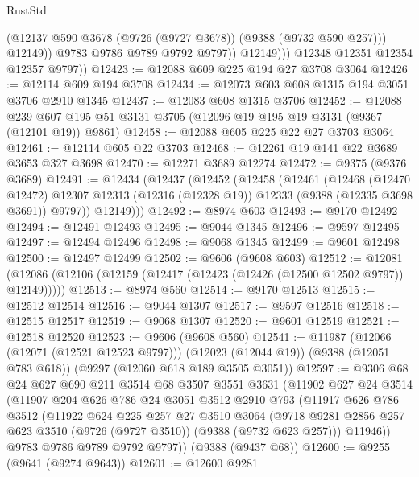 \begin{lexlean}{RustStd}
\begin{coremodule}
                      (@12137 @590 @3678 (@9726 (@9727 @3678)) (@9388 (@9732 @590 @257)))
                      @12149))
                  @9783
                  @9786
                  @9789
                  @9792
                  @9797))
              @12149)))
        @12348
        @12351
        @12354
        @12357
        @9797))
@12423 := @12088 @609 @225 @194 @27 @3708 @3064
@12426 := @12114 @609 @194 @3708
@12434 := @12073 @603 @608 @1315 @194 @3051 @3706 @2910 @1345
@12437 := @12083 @608 @1315 @3706
@12452 := @12088
    @239
    @607
    @195
    @51
    @3131
    @3705
    (@12096 @19 @195 @19 @3131 (@9367 (@12101 @19)) @9861)
@12458 := @12088 @605 @225 @22 @27 @3703 @3064
@12461 := @12114 @605 @22 @3703
@12468 := @12261 @19 @141 @22 @3689 @3653 @327 @3698
@12470 := @12271 @3689 @12274
@12472 := @9375 (@9376 @3689)
@12491 := @12434
    (@12437
      (@12452
        (@12458
          (@12461
            (@12468
              (@12470 @12472)
              @12307
              @12313
              (@12316 (@12328 @19))
              @12333
              (@9388 (@12335 @3698 @3691))
              @9797))
          @12149)))
@12492 := @8974 @603
@12493 := @9170 @12492
@12494 := @12491 @12493
@12495 := @9044 @1345
@12496 := @9597 @12495
@12497 := @12494 @12496
@12498 := @9068 @1345
@12499 := @9601 @12498
@12500 := @12497 @12499
@12502 := @9606 (@9608 @603)
@12512 := @12081 (@12086 (@12106 (@12159 (@12417 (@12423 (@12426 (@12500 @12502 @9797)) @12149)))))
@12513 := @8974 @560
@12514 := @9170 @12513
@12515 := @12512 @12514
@12516 := @9044 @1307
@12517 := @9597 @12516
@12518 := @12515 @12517
@12519 := @9068 @1307
@12520 := @9601 @12519
@12521 := @12518 @12520
@12523 := @9606 (@9608 @560)
@12541 := @11987
    (@12066 (@12071 (@12521 @12523 @9797)))
    (@12023 (@12044 @19))
    (@9388 (@12051 @783 @618))
    (@9297 (@12060 @618 @189 @3505 @3051))
@12597 := @9306
    @68
    @24
    @627
    @690
    @211
    @3514
    @68
    @3507
    @3551
    @3631
    (@11902
      @627
      @24
      @3514
      (@11907
        @204
        @626
        @786
        @24
        @3051
        @3512
        @2910
        @793
        (@11917
          @626
          @786
          @3512
          (@11922
            @624
            @225
            @257
            @27
            @3510
            @3064
            (@9718 @9281 @2856 @257 @623 @3510 (@9726 (@9727 @3510)) (@9388 (@9732 @623 @257)))
            @11946))
        @9783
        @9786
        @9789
        @9792
        @9797))
    (@9388 (@9437 @68))
@12600 := @9255 (@9641 (@9274 @9643))
@12601 := @12600 @9281

\end{coremodule}
\end{lexlean}
